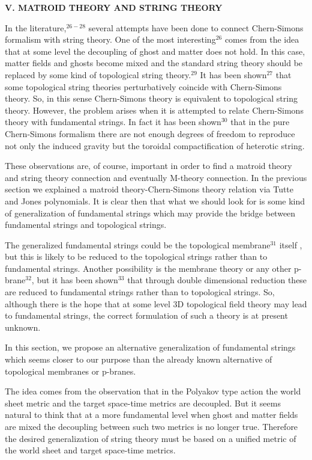 \documentclass[a4paper,12pt]{article}
\begin{document}
\smallskip

\noindent \textbf{V. MATROID THEORY AND STRING THEORY}

\bigskip

In the literature,$^{26-28}$ several attempts have been done to connect
Chern-Simons formalism with string theory. One of the most interesting$^{26}$
comes from the idea that at some level the decoupling of ghost and matter
does not hold. In this case, matter fields and ghosts become mixed and the
standard string theory should be replaced by some kind of topological string
theory.$^{29}$ It has been shown$^{27}$ that some topological string
theories perturbatively coincide with Chern-Simons theory. So, in this sense
Chern-Simons theory is equivalent to topological string theory. However, the
problem arises when it is attempted to relate Chern-Simons theory with
fundamental strings. In fact it has been shown$^{30}$ that in the pure
Chern-Simons formalism there are not enough degrees of freedom to reproduce
not only the induced gravity but the toroidal compactification of heterotic
string.

These observations are, of course, important in order to find a matroid
theory and string theory connection and eventually M-theory connection. In
the previous section we explained a matroid theory-Chern-Simons theory
relation via Tutte and Jones polynomials. It is clear then that what we
should look for is some kind of generalization of fundamental strings which
may provide the bridge between fundamental strings and topological strings.

The generalized fundamental strings could be the topological membrane$^{31}$
itself , but this is likely to be reduced to the topological strings rather
than to fundamental strings. Another possibility is the membrane theory or
any other p-brane$^{32}$, but it has been shown$^{33}$ that through double
dimensional reduction these are reduced to fundamental strings rather than
to topological strings. So, although there is the hope that at some level 3D
topological field theory may lead to fundamental strings, the correct
formulation of such a theory is at present unknown.

In this section, we propose an alternative generalization of fundamental
strings which seems closer to our purpose than the already known alternative
of topological membranes or p-branes.

The idea comes from the observation that in the Polyakov type action the
world sheet metric and the target space-time metrics are decoupled. But it
seems natural to think that at a more fundamental level when ghost and
matter fields are mixed the decoupling between such two metrics is no longer
true. Therefore the desired generalization of string theory must be based on
a unified metric of the world sheet and target space-time metrics.
\end{document}
